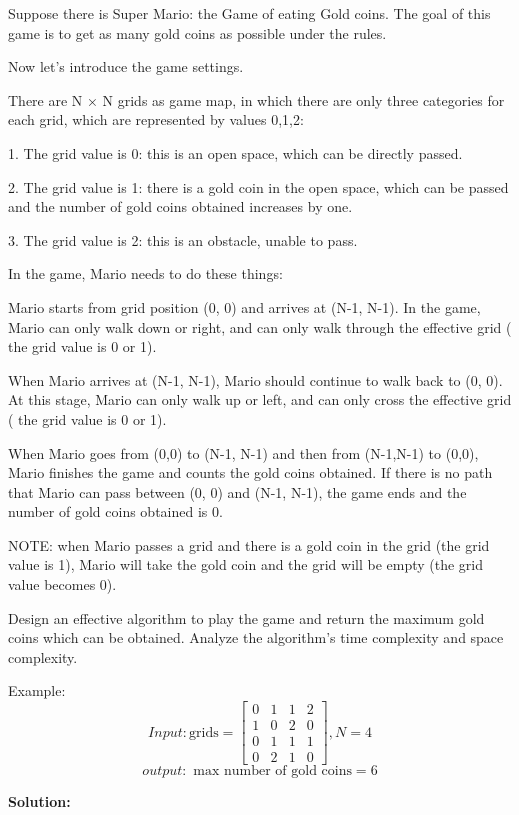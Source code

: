 \problem{}
Suppose there is Super Mario: the Game of eating Gold coins.
The goal of this game is to get as many gold coins as possible under the rules.
\par
Now let's introduce the game settings.
\par
There are N × N grids as game map, in which there are only three categories for each grid, which are represented by values 0,1,2:

1. The grid value is 0: this is an open space, which can be directly passed.

2. The grid value is 1: there is a gold coin in the open space, which can be passed and the number of gold coins obtained increases by one.

3. The grid value is 2: this is an obstacle, unable to pass.

In the game, Mario needs to do these things:
\par
Mario starts from grid position (0, 0) and arrives at (N-1, N-1). In the game, Mario can only walk down or right, and can only walk through the effective grid ( the grid value is 0 or 1).

When Mario arrives at (N-1, N-1), Mario should continue to walk back to (0, 0). At this stage, Mario can only walk up or left, and can only cross the effective grid ( the grid value is 0 or 1).

When Mario goes from (0,0) to (N-1, N-1) and then from (N-1,N-1) to (0,0), Mario finishes the game and counts the gold coins obtained.
If there is no path that Mario can pass between (0, 0) and (N-1, N-1), the game ends and the number of gold coins obtained is 0.

NOTE: when Mario passes a grid and there is a gold coin in the grid (the grid value is 1), Mario will take the gold coin and the grid will be empty (the grid value becomes 0).

Design an effective algorithm to play the game and return the maximum gold coins which can be obtained. Analyze the algorithm’s time complexity and space complexity.

Example:
$$
Input: \text{grids} = \begin{bmatrix}
  0&  1&  1& 2\\
  1&  0&  2& 0\\
  0 & 1 & 1 & 1\\
  0& 2&  1  &0
\end{bmatrix}, N=4
$$
$$
output: \text{ max number of gold coins} = 6
$$

\textbf{Solution:}

